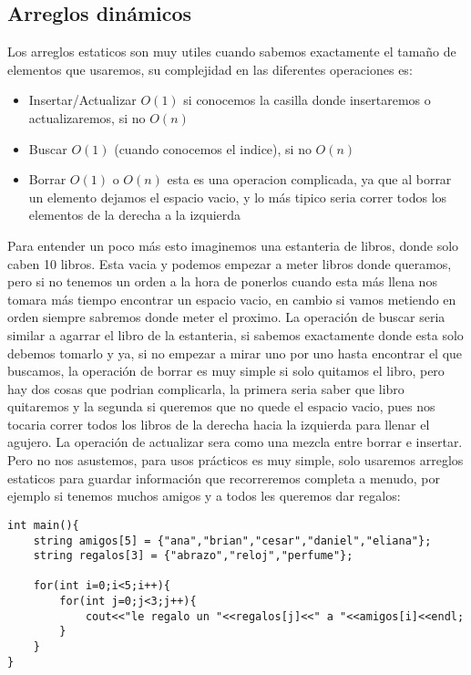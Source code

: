 \subsection{Arreglos dinámicos}
Los arreglos estaticos son muy utiles cuando sabemos exactamente el tamaño de elementos que usaremos, su complejidad en las diferentes operaciones es:
\begin{itemize}
    \item Insertar/Actualizar $O(1)$ si conocemos la casilla donde insertaremos o actualizaremos, si no $O(n)$
    \item Buscar   $O(1)$ (cuando conocemos el indice), si no $O(n)$
    \item Borrar   $O(1)$ o $O(n)$ esta es una operacion complicada, ya que al borrar un elemento dejamos el espacio vacio, y lo más tipico seria correr todos los elementos de la derecha a la izquierda
\end{itemize}
Para entender un poco más esto imaginemos una estanteria de libros, donde solo caben 10 libros. Esta vacia y podemos empezar a meter libros donde queramos, pero si no tenemos un orden a la hora de ponerlos cuando esta más llena nos tomara más tiempo encontrar un espacio vacio, en cambio si vamos metiendo en orden siempre sabremos donde meter el proximo. La operación de buscar seria similar a agarrar el libro de la estanteria, si sabemos exactamente donde esta solo debemos tomarlo y ya, si no empezar a mirar uno por uno hasta encontrar el que buscamos, la operación de borrar es muy simple si solo quitamos el libro, pero hay dos cosas que podrian complicarla, la primera seria saber que libro quitaremos y la segunda si queremos que no quede el espacio vacio, pues nos tocaria correr todos los libros de la derecha hacia la izquierda para llenar el agujero. La operación de actualizar sera como una mezcla entre borrar e insertar.
\\Pero no nos asustemos, para usos prácticos es muy simple, solo usaremos arreglos estaticos para guardar información que recorreremos completa a menudo, por ejemplo si tenemos muchos amigos y a todos les queremos dar regalos:
\\\begin{minipage}{\textwidth}
\begin{lstlisting}[style=C,caption=arregloAmigos.cpp]
int main(){
    string amigos[5] = {"ana","brian","cesar","daniel","eliana"};
    string regalos[3] = {"abrazo","reloj","perfume"};

    for(int i=0;i<5;i++){
        for(int j=0;j<3;j++){
            cout<<"le regalo un "<<regalos[j]<<" a "<<amigos[i]<<endl;
        }
    }
}
\end{lstlisting}
\end{minipage}
